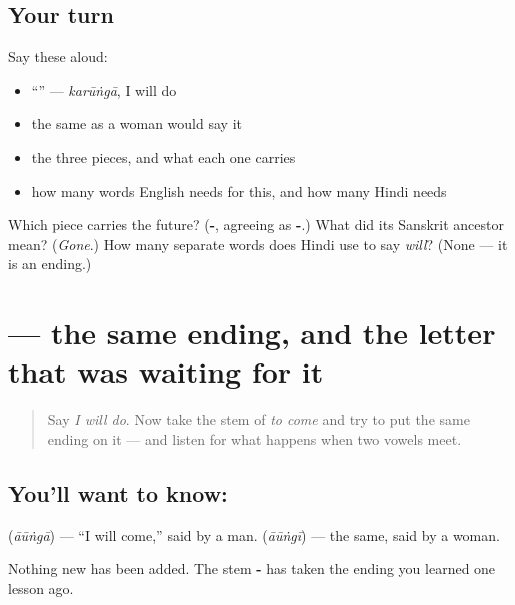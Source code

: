 \subsection*{Your turn}
Say these aloud:

\begin{itemize}
\raggedright
  \item \textquotedblleft{}\textquotedblright{} — \emph{karūṅgā}, I will do
  \item the same as a woman would say it
  \item the three pieces, and what each one carries
  \item how many words English needs for this, and how many Hindi needs
\end{itemize}

\begin{tcolorbox}[breakable,colback=teal!4,colframe=teal!35!black,title={Before you move on}]
Which piece carries the future? (\textbf{-}, agreeing as \textbf{-}.) What did its Sanskrit ancestor mean? (\emph{Gone}.) How many separate words does Hindi use to say \emph{will}? (None — it is an ending.)
\end{tcolorbox}
\section[\texorpdfstring{\hi{आऊँगा} (āūṅgā)}{आऊँगा (āūṅgā)}]{ — the same ending, and the letter that was waiting for it}

\label{lesson:HI-C88-aaunga}



\begin{quote}
Say \emph{I will do}. Now take the stem of \emph{to come} and try to put the same ending on it — and listen for what happens when two vowels meet.
\end{quote}

\subsection*{You'll want to know: }
\textbf{} (\emph{āūṅgā}) — \textquotedblleft{}I will come,\textquotedblright{} said by a man. \textbf{} (\emph{āūṅgī}) — the same, said by a woman.

Nothing new has been added. The stem \textbf{-} has taken the ending you learned one lesson ago.

